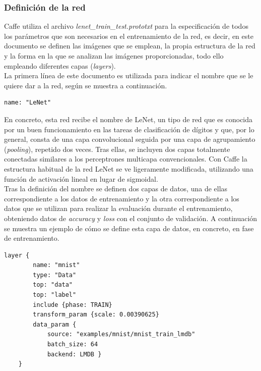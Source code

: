 \subsubsection{Definición de la red}
	Caffe utiliza el archivo 
	\textit{lenet\_train\_test.prototxt} para la especificación de todos los parámetros que son necesarios en el entrenamiento de la red, es decir, en este documento se definen las imágenes que se emplean, la propia estructura de la red y la forma en la que se analizan las imágenes proporcionadas, todo ello empleando diferentes capas (\textit{layers}).\\

	La primera línea de este documento es utilizada para indicar el nombre que se le quiere dar a la red, según se muestra a continuación.
	\vspace{10pt}
	\begin{lstlisting}[frame=single]
	name: "LeNet"
	\end{lstlisting}
	
	En concreto, esta red recibe el nombre de LeNet, un tipo de red que es conocida por un buen funcionamiento en las tareas de clasificación de dígitos y que, por lo general, consta de una capa convolucional seguida por una capa de agrupamiento (\textit{pooling}), repetido dos veces. Tras ellas, se incluyen dos capas totalmente conectadas similares a los perceptrones multicapa convencionales. Con Caffe la estructura habitual de la red LeNet se ve ligeramente modificada, utilizando una función de activación lineal en lugar de sigmoidal.\\

	Tras la definición del nombre se definen dos capas de datos, una de ellas correspondiente a los datos de entrenamiento y la otra correspondiente a los datos que se utilizan para realizar la evaluación durante el entrenamiento, obteniendo datos de \textit{accuracy} y \textit{loss} con el conjunto de validación. A continuación se muestra un ejemplo de cómo se define esta capa de datos, en concreto, en fase de entrenamiento.
	\vspace{60pt}
	\begin{lstlisting}[frame=single]
	layer {
		name: "mnist"
		type: "Data"
		top: "data"
		top: "label"
		include {phase: TRAIN}
		transform_param {scale: 0.00390625}
		data_param {
			source: "examples/mnist/mnist_train_lmdb"
			batch_size: 64
			backend: LMDB }
	}
	\end{lstlisting}
	
